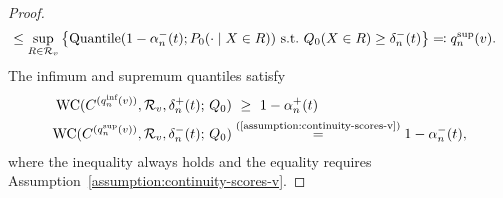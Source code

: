 \begin{proof}
\begin{align}
    & \le 
    \sup_{R \in \mathcal{R}_v}
    \left\{
    \textup{Quantile}(1-\alpha^-_n(t); P_0( \cdot \mid X \in R))
    ~ \mbox{s.t.}~
    Q_0( X \in R) \ge \delta^-_n(t)\right\}
    \eqqcolon q_n^{\sup}(v) \nonumber.
  \end{align}
  The infimum and supremum quantiles satisfy
  \begin{equation*}
    \begin{split}
      \textup{WC}(C^{(q_n^\text{inf}(v))}, \mathcal{R}_v,
      \delta_{n}^{+}(t); \, Q_0)
      & ~ \ge ~ 1 - \alpha_{n}^{+}(t) \\
      \textup{WC}(C^{(q_n^\text{sup}(v))}, \mathcal{R}_v, \delta_n^{-}(t); \, Q_0)
      & \stackrel{(\textup{\ref{assumption:continuity-scores-v}})}{=}
      1 - \alpha_{n}^{-}(t),
    \end{split}
  \end{equation*}
  where the inequality always holds and the equality requires
  Assumption~\ref{assumption:continuity-scores-v}.


\end{proof}
